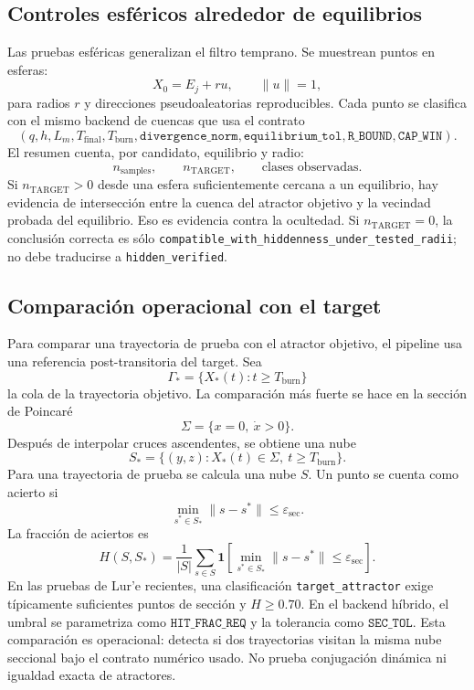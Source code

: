 \documentclass[11pt]{article}
\begin{document}
\subsection{Controles esféricos alrededor de equilibrios}

Las pruebas esféricas generalizan el filtro temprano. Se muestrean puntos en
esferas:
\[
X_0=E_j+r u,\qquad \|u\|=1,
\]
para radios \(r\) y direcciones pseudoaleatorias reproducibles. Cada punto se
clasifica con el mismo backend de cuencas que usa el contrato
\[
(q,h,L_m,T_{\mathrm{final}},T_{\mathrm{burn}},
\texttt{divergence\_norm},\texttt{equilibrium\_tol},
\texttt{R\_BOUND},\texttt{CAP\_WIN}).
\]
El resumen cuenta, por candidato, equilibrio y radio:
\[
n_{\mathrm{samples}},\qquad
n_{\mathrm{TARGET}},\qquad
\text{clases observadas}.
\]
Si \(n_{\mathrm{TARGET}}>0\) desde una esfera suficientemente cercana a un equilibrio,
hay evidencia de intersección entre la cuenca del atractor objetivo y la
vecindad probada del equilibrio. Eso es evidencia contra la ocultedad. Si
\(n_{\mathrm{TARGET}}=0\), la conclusión correcta es sólo
\texttt{compatible\_with\_hiddenness\_under\_tested\_radii}; no debe
traducirse a \texttt{hidden\_verified}.

\subsection{Comparación operacional con el target}

Para comparar una trayectoria de prueba con el atractor objetivo, el pipeline
usa una referencia post-transitoria del target. Sea
\[
\Gamma_\ast=\{X_\ast(t):t\geq T_{\mathrm{burn}}\}
\]
la cola de la trayectoria objetivo. La comparación más fuerte se hace en la
sección de Poincaré
\[
\Sigma=\{x=0,\ \dot x>0\}.
\]
Después de interpolar cruces ascendentes, se obtiene una nube
\[
S_\ast=\{(y,z): X_\ast(t)\in\Sigma,\ t\geq T_{\mathrm{burn}}\}.
\]
Para una trayectoria de prueba se calcula una nube \(S\). Un punto se cuenta
como acierto si
\[
\min_{s^\ast\in S_\ast}\|s-s^\ast\|\leq\varepsilon_{\mathrm{sec}}.
\]
La fracción de aciertos es
\[
H(S,S_\ast)=
\frac{1}{|S|}
\sum_{s\in S}
\mathbf{1}\left[
\min_{s^\ast\in S_\ast}\|s-s^\ast\|\leq\varepsilon_{\mathrm{sec}}
\right].
\]
En las pruebas de Lur'e recientes, una clasificación \texttt{target\_attractor}
exige típicamente suficientes puntos de sección y \(H\geq0.70\). En el backend
híbrido, el umbral se parametriza como \(\texttt{HIT\_FRAC\_REQ}\) y la
tolerancia como \(\texttt{SEC\_TOL}\). Esta comparación es operacional:
detecta si dos trayectorias visitan la misma nube seccional bajo el contrato
numérico usado. No prueba conjugación dinámica ni igualdad exacta de
atractores.
\end{document}
